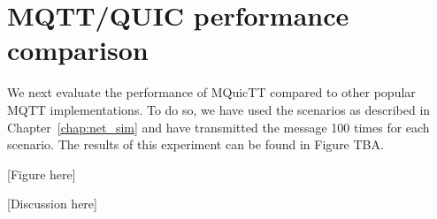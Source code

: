 \section{MQTT/QUIC performance comparison}

We next evaluate the performance of MQuicTT compared to other popular MQTT implementations.
To do so, we have used the scenarios as described in Chapter~\ref{chap:net_sim} and have transmitted the message 100 times for each scenario.
The results of this experiment can be found in Figure TBA.

[Figure here]

[Discussion here]